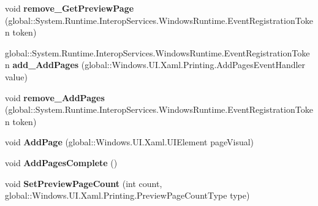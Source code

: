 \begin{DoxyCompactItemize}
\item 
\mbox{\label{interface_windows_1_1_u_i_1_1_xaml_1_1_printing_1_1_i_print_document_aa975f5387eb09201d39628055f1bfb7d}} 
void {\bfseries remove\+\_\+\+Get\+Preview\+Page} (global\+::\+System.\+Runtime.\+Interop\+Services.\+Windows\+Runtime.\+Event\+Registration\+Token token)
\item 
\mbox{\label{interface_windows_1_1_u_i_1_1_xaml_1_1_printing_1_1_i_print_document_a6a0ff286beb8ddcdbe12d51a49010b97}} 
global\+::\+System.\+Runtime.\+Interop\+Services.\+Windows\+Runtime.\+Event\+Registration\+Token {\bfseries add\+\_\+\+Add\+Pages} (global\+::\+Windows.\+U\+I.\+Xaml.\+Printing.\+Add\+Pages\+Event\+Handler value)
\item 
\mbox{\label{interface_windows_1_1_u_i_1_1_xaml_1_1_printing_1_1_i_print_document_a78e46b68309d6b34dfdab7f6631761a6}} 
void {\bfseries remove\+\_\+\+Add\+Pages} (global\+::\+System.\+Runtime.\+Interop\+Services.\+Windows\+Runtime.\+Event\+Registration\+Token token)
\item 
\mbox{\label{interface_windows_1_1_u_i_1_1_xaml_1_1_printing_1_1_i_print_document_ade20244bcf646d2b02009597f231a389}} 
void {\bfseries Add\+Page} (global\+::\+Windows.\+U\+I.\+Xaml.\+U\+I\+Element page\+Visual)
\item 
\mbox{\label{interface_windows_1_1_u_i_1_1_xaml_1_1_printing_1_1_i_print_document_afd3c80952164c742e794be2817c23c65}} 
void {\bfseries Add\+Pages\+Complete} ()
\item 
\mbox{\label{interface_windows_1_1_u_i_1_1_xaml_1_1_printing_1_1_i_print_document_a3fad032cb5b86f827a5b5428c9ba1d34}} 
void {\bfseries Set\+Preview\+Page\+Count} (int count, global\+::\+Windows.\+U\+I.\+Xaml.\+Printing.\+Preview\+Page\+Count\+Type type)
\item 
\mbox{\label{interface_windows_1_1_u_i_1_1_xaml_1_1_printing_1_1_i_print_document_a2fb474592368092099efc8562a7c1bb6}} 

\end{DoxyCompactItemize}
